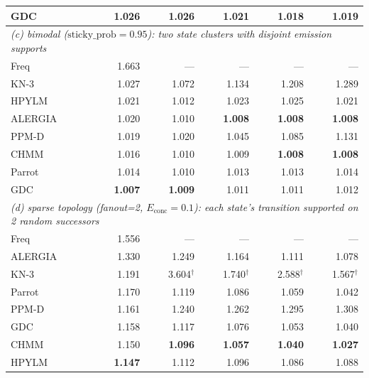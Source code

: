 \begin{table}[t]
\begin{tabular}{l r r r r r}
GDC     & \textbf{1.026} & 1.026          & 1.021          & 1.018          & 1.019          \\
\midrule
\multicolumn{6}{l}{\emph{(c) bimodal ($\mathrm{sticky\_prob}{=}0.95$): two state clusters with disjoint emission supports}} \\
Freq    & 1.663          & ---            & ---            & ---            & ---            \\
KN-3    & 1.027          & 1.072          & 1.134          & 1.208          & 1.289          \\
HPYLM   & 1.021          & 1.012          & 1.023          & 1.025          & 1.021          \\
ALERGIA & 1.020          & 1.010          & \textbf{1.008} & \textbf{1.008} & \textbf{1.008} \\
PPM-D   & 1.019          & 1.020          & 1.045          & 1.085          & 1.131          \\
CHMM    & 1.016          & 1.010          & 1.009          & \textbf{1.008} & \textbf{1.008} \\
Parrot  & 1.014          & 1.010          & 1.013          & 1.013          & 1.014          \\
GDC     & \textbf{1.007} & \textbf{1.009} & 1.011          & 1.011          & 1.012          \\
\midrule
\multicolumn{6}{l}{\emph{(d) sparse topology (fanout=2, $E_{\mathrm{conc}}{=}0.1$): each state's transition supported on 2 random successors}} \\
Freq    & 1.556          & ---            & ---            & ---            & ---            \\
ALERGIA & 1.330          & 1.249          & 1.164          & 1.111          & 1.078          \\
KN-3    & 1.191          & 3.604$^\dagger$ & 1.740$^\dagger$ & 2.588$^\dagger$ & 1.567$^\dagger$ \\
Parrot  & 1.170          & 1.119          & 1.086          & 1.059          & 1.042          \\
PPM-D   & 1.161          & 1.240          & 1.262          & 1.295          & 1.308          \\
GDC     & 1.158          & 1.117          & 1.076          & 1.053          & 1.040          \\
CHMM    & 1.150          & \textbf{1.096} & \textbf{1.057} & \textbf{1.040} & \textbf{1.027} \\
HPYLM   & \textbf{1.147} & 1.112          & 1.096          & 1.086          & 1.088          \\
\bottomrule
\end{tabular}
\end{table}


